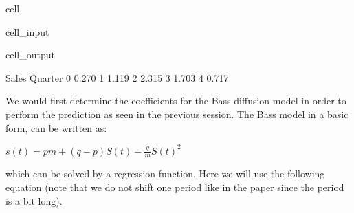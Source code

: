 \documentclass[letterpaper,10pt,english]{jupyterBook}
\begin{document}
\begin{sphinxuseclass}{cell}\begin{sphinxVerbatimInput}

\begin{sphinxuseclass}{cell_input}
\begin{sphinxVerbatim}[commandchars=\\\{\}]
   
   
 
   

  
   
\end{sphinxVerbatim}

\end{sphinxuseclass}\end{sphinxVerbatimInput}
\begin{sphinxVerbatimOutput}

\begin{sphinxuseclass}{cell_output}
\begin{sphinxVerbatim}[commandchars=\\\{\}]
         Sales
Quarter       
0        0.270
1        1.119
2        2.315
3        1.703
4        0.717
\end{sphinxVerbatim}

\end{sphinxuseclass}\end{sphinxVerbatimOutput}

\end{sphinxuseclass}
\sphinxAtStartPar
We would first determine the coefficients for the Bass diffusion model in order to perform the prediction as seen in the previous session. The Bass model in a basic form, can be written as:

\sphinxAtStartPar
\(s(t) = pm + (q-p)S(t) - \frac{q}{m}S(t)^2\)

\sphinxAtStartPar
which can be solved by a regression function. Here we will use the following equation (note that we do not shift one period like in the paper since the period is a bit long).
\end{document}
